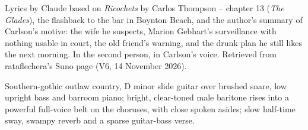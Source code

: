 
\begin{notes}
Lyrics by Claude based on \emph{Ricochets} by Carlos Thompson -- chapter 13 (\emph{The Glades}), the flashback to the bar in Boynton Beach, and the author's summary of Carlson's motive: the wife he suspects, Marion Gebhart's surveillance with nothing usable in court, the old friend's warning, and the drunk plan he still likes the next morning. In the second person, in Carlson's voice. Retrieved from rataflechera's Suno page (V6, 14 November 2026).
\end{notes}
\begin{style}
Southern-gothic outlaw country, D minor slide guitar over brushed snare, low upright bass and barroom piano; bright, clear-toned male baritone rises into a powerful full-voice belt on the choruses, with close spoken asides; slow half-time sway, swampy reverb and a sparse guitar-bass verse.
\end{style}
